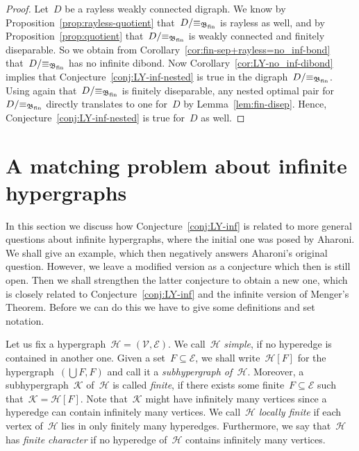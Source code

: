 \documentclass[reqno, 12pt]{amsart}
\numberwithin{equation}{section}
\numberwithin{figure}{section}
\theoremstyle{plain}
\theoremstyle{definition}
\begin{document}
\begin{proof}
    Let~$D$ be a rayless weakly connected digraph.
    We know by Proposition~\ref{prop:rayless-quotient} that~${D{/}{\equiv_{\mathfrak{B}_\textnormal{fin}}}}$ is rayless as well, and by Proposition~\ref{prop:quotient} that~${D{/}{\equiv_{\mathfrak{B}_\textnormal{fin}}}}$ is weakly connected and finitely diseparable.
    So we obtain from Corollary~\ref{cor:fin-sep+rayless=no_inf-bond} that~${D{/}{\equiv_{\mathfrak{B}_\textnormal{fin}}}}$ has no infinite dibond.
    Now Corollary~\ref{cor:LY-no_inf-dibond} implies that Conjecture~\ref{conj:LY-inf-nested} is true in the digraph~${D{/}{\equiv_{\mathfrak{B}_\textnormal{fin}}}}$.
    Using again that~${D{/}{\equiv_{\mathfrak{B}_\textnormal{fin}}}}$ is finitely diseparable, any nested optimal pair for~${D{/}{\equiv_{\mathfrak{B}_\textnormal{fin}}}}$ directly translates to one for~$D$ by Lemma~\ref{lem:fin-disep}.
    Hence, Conjecture~\ref{conj:LY-inf-nested} is true for~$D$ as well.
\end{proof}



\section{A matching problem about infinite hypergraphs}
\label{sec:hypergraphs}

In this section we discuss how Conjecture~\ref{conj:LY-inf} is related to more general questions about infinite hypergraphs, where the initial one was posed by Aharoni.
We shall give an example, which then negatively answers Aharoni's original question.
However, we leave a modified version as a conjecture which then is still open.
Then we shall strengthen the latter conjecture to obtain a new one, which is closely related to Conjecture~\ref{conj:LY-inf} and the infinite version of Menger's Theorem.
Before we can do this we have to give some definitions and set notation.

Let us fix a hypergraph~${\mathcal{H} = (\mathcal{V}, \mathcal{E})}$. 
We call~$\mathcal{H}$ \textit{simple}, if no hyperedge is contained in another one. 
Given a set~${F \subseteq \mathcal{E}}$, we shall write~${\mathcal{H}[F]}$ for the hypergraph~${(\bigcup F, F)}$ and call it a \textit{subhypergraph of~$\mathcal{H}$}.
Moreover, a subhypergraph~$\mathcal{K}$ of~$\mathcal{H}$ is called \textit{finite}, if there exists some finite~${F \subseteq \mathcal{E}}$ such that~${\mathcal{K} = \mathcal{H}[F]}$. 
Note that~$\mathcal{K}$ might have infinitely many vertices since a hyperedge can contain infinitely many vertices.
We call~$\mathcal{H}$ \textit{locally finite} if each vertex of~$\mathcal{H}$ lies in only finitely many hyperedges.
Furthermore, we say that~$\mathcal{H}$ has \textit{finite character} if no hyperedge of~$\mathcal{H}$ contains infinitely many vertices.
\end{document}

